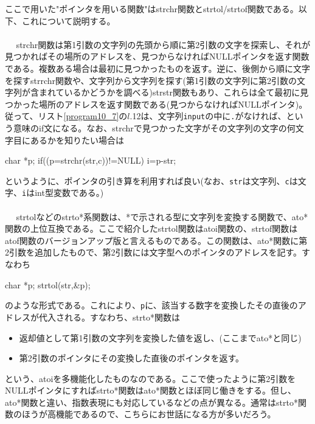 ここで用いた"ポインタを用いる関数"はstrchr関数とstrtol/strtof関数である。以下、これについて説明する。
\\ \\　
strchr関数は第1引数の文字列の先頭から順に第2引数の文字を探索し、それが見つかればその場所のアドレスを、見つからなければNULLポインタを返す関数である。複数ある場合は最初に見つかったものを返す。逆に、後側から順に文字を探すstrrchr関数や、文字列から文字列を探す(第1引数の文字列に第2引数の文字列が含まれているかどうかを調べる)strstr関数もあり、これらは全て最初に見つかった場所のアドレスを返す関数である(見つからなければNULLポインタ)。従って、リスト\ref{program10_7}の$l$.12は、文字列\verb|input|の中に\verb|.|がなければ、という意味のif文になる。なお、strchrで見つかった文字がその文字列の文字の何文字目にあるかを知りたい場合は
\begin{code}
char *p;
if((p=strchr(str,c))!=NULL) i=p-str;
\end{code}
というように、ポインタの引き算を利用すれば良い(なお、\verb|str|は文字列、\verb|c|は文字、\verb|i|はint型変数である。) 
\\ \\　
strtolなどのstrto*系関数は、*で示される型に文字列を変換する関数で、ato*関数の上位互換である。ここで紹介したstrtol関数はatoi関数の、strtof関数はatof関数のバージョンアップ版と言えるものである。この関数は、ato*関数に第2引数を追加したもので、第2引数には文字型へのポインタのアドレスを記す。すなわち
\begin{code}
char *p;
strtol(str,&p);
\end{code}
のような形式である。これにより、\verb|p|に、該当する数字を変換したその直後のアドレスが代入される。すなわち、strto*関数は
\begin{itemize}
\item 返却値として第1引数の文字列を変換した値を返し、(ここまでato*と同じ)
\item 第2引数のポインタにその変換した直後のポインタを返す。
\end{itemize}
という、atoiを多機能化したものなのである。ここで使ったように第2引数をNULLポインタにすればstrto*関数はato*関数とほぼ同じ働きをする。但し、ato*関数と違い、指数表現にも対応しているなどの点が異なる。通常はstrto*関数のほうが高機能であるので、こちらにお世話になる方が多いだろう。

\newpage

